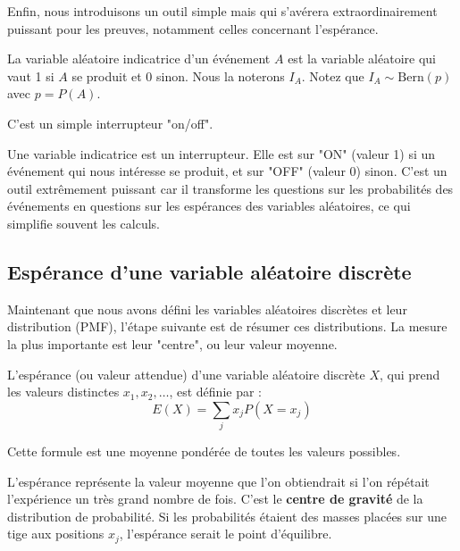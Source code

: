 Enfin, nous introduisons un outil simple mais qui s'avérera extraordinairement puissant pour les preuves, notamment celles concernant l'espérance.

\begin{definitionbox}
La variable aléatoire indicatrice d'un événement $A$ est la variable aléatoire qui vaut 1 si $A$ se produit et 0 sinon. Nous la noterons $I_A$. Notez que $I_A \sim \text{Bern}(p)$ avec $p=P(A)$.
\end{definitionbox}

C'est un simple interrupteur "on/off".

\begin{intuitionbox}
Une variable indicatrice est un interrupteur. Elle est sur "ON" (valeur 1) si un événement qui nous intéresse se produit, et sur "OFF" (valeur 0) sinon. C'est un outil extrêmement puissant car il transforme les questions sur les probabilités des événements en questions sur les espérances des variables aléatoires, ce qui simplifie souvent les calculs.
\end{intuitionbox}

\subsection{Espérance d'une variable aléatoire discrète}

Maintenant que nous avons défini les variables aléatoires discrètes et leur distribution (PMF), l'étape suivante est de résumer ces distributions. La mesure la plus importante est leur "centre", ou leur valeur moyenne.

\begin{definitionbox}
L'espérance (ou valeur attendue) d'une variable aléatoire discrète $X$, qui prend les valeurs distinctes $x_1, x_2, \dots$, est définie par :
$$E(X) = \sum_j x_j P(X=x_j)$$
\end{definitionbox}

Cette formule est une moyenne pondérée de toutes les valeurs possibles.

\begin{intuitionbox}
L'espérance représente la valeur moyenne que l'on obtiendrait si l'on répétait l'expérience un très grand nombre de fois. C'est le \textbf{centre de gravité} de la distribution de probabilité. Si les probabilités étaient des masses placées sur une tige aux positions $x_j$, l'espérance serait le point d'équilibre.
\end{intuitionbox}

